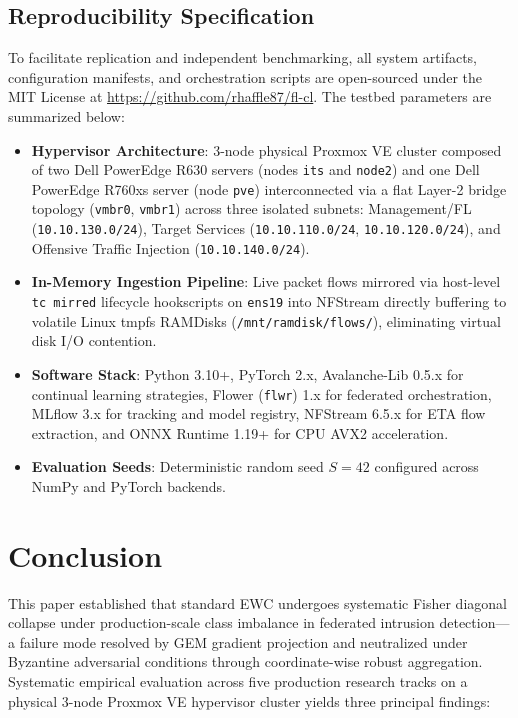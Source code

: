 \documentclass[journal,10pt,twocolumn]{IEEEtran}
\begin{document}
\subsection*{Reproducibility Specification}
To facilitate replication and independent benchmarking, all system artifacts, configuration manifests, and orchestration scripts are open-sourced under the MIT License at \url{https://github.com/rhaffle87/fl-cl}. The testbed parameters are summarized below:
\begin{itemize}
    \item \textbf{Hypervisor Architecture}: 3-node physical Proxmox VE cluster composed of two Dell PowerEdge R630 servers (nodes \texttt{its} and \texttt{node2}) and one Dell PowerEdge R760xs server (node \texttt{pve}) interconnected via a flat Layer-2 bridge topology (\texttt{vmbr0}, \texttt{vmbr1}) across three isolated subnets: Management/FL (\texttt{10.10.130.0/24}), Target Services (\texttt{10.10.110.0/24}, \texttt{10.10.120.0/24}), and Offensive Traffic Injection (\texttt{10.10.140.0/24}).
    \item \textbf{In-Memory Ingestion Pipeline}: Live packet flows mirrored via host-level \texttt{tc mirred} lifecycle hookscripts on \texttt{ens19} into NFStream directly buffering to volatile Linux tmpfs RAMDisks (\texttt{/mnt/ramdisk/flows/}), eliminating virtual disk I/O contention.
    \item \textbf{Software Stack}: Python 3.10+, PyTorch 2.x, Avalanche-Lib 0.5.x for continual learning strategies, Flower (\texttt{flwr}) 1.x for federated orchestration, MLflow 3.x for tracking and model registry, NFStream 6.5.x for ETA flow extraction, and ONNX Runtime 1.19+ for CPU AVX2 acceleration.
    \item \textbf{Evaluation Seeds}: Deterministic random seed $S=42$ configured across NumPy and PyTorch backends.
\end{itemize}

\section{Conclusion}
\balance

This paper established that standard EWC undergoes systematic Fisher diagonal collapse under production-scale class imbalance in federated intrusion detection---a failure mode resolved by GEM gradient projection and neutralized under Byzantine adversarial conditions through coordinate-wise robust aggregation. Systematic empirical evaluation across five production research tracks on a physical 3-node Proxmox VE hypervisor cluster yields three principal findings:
\end{document}
